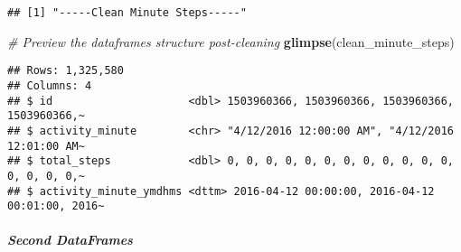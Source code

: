 \documentclass[
]{article}
\newenvironment{Shaded}{\begin{snugshade}}{\end{snugshade}}
\newcommand{\AttributeTok}[1]{\textcolor[rgb]{0.13,0.29,0.53}{#1}}
\newcommand{\CommentTok}[1]{\textcolor[rgb]{0.56,0.35,0.01}{\textit{#1}}}
\newcommand{\FunctionTok}[1]{\textcolor[rgb]{0.13,0.29,0.53}{\textbf{#1}}}
\newcommand{\NormalTok}[1]{#1}
\newcommand{\OtherTok}[1]{\textcolor[rgb]{0.56,0.35,0.01}{#1}}
\newcommand{\SpecialCharTok}[1]{\textcolor[rgb]{0.81,0.36,0.00}{\textbf{#1}}}
\newcommand{\StringTok}[1]{\textcolor[rgb]{0.31,0.60,0.02}{#1}}
\begin{document}
\begin{Shaded}
\end{Shaded}

\begin{verbatim}
## [1] "-----Clean Minute Steps-----"
\end{verbatim}

\begin{Shaded}
\begin{Highlighting}[]
\CommentTok{\# Preview the dataframe\textquotesingle{}s structure post{-}cleaning}
\FunctionTok{glimpse}\NormalTok{(clean\_minute\_steps)}
\end{Highlighting}
\end{Shaded}

\begin{verbatim}
## Rows: 1,325,580
## Columns: 4
## $ id                     <dbl> 1503960366, 1503960366, 1503960366, 1503960366,~
## $ activity_minute        <chr> "4/12/2016 12:00:00 AM", "4/12/2016 12:01:00 AM~
## $ total_steps            <dbl> 0, 0, 0, 0, 0, 0, 0, 0, 0, 0, 0, 0, 0, 0, 0, 0,~
## $ activity_minute_ymdhms <dttm> 2016-04-12 00:00:00, 2016-04-12 00:01:00, 2016~
\end{verbatim}

\hypertarget{second-dataframes}{%
\subparagraph{Second DataFrames}\label{second-dataframes}}
\end{document}
